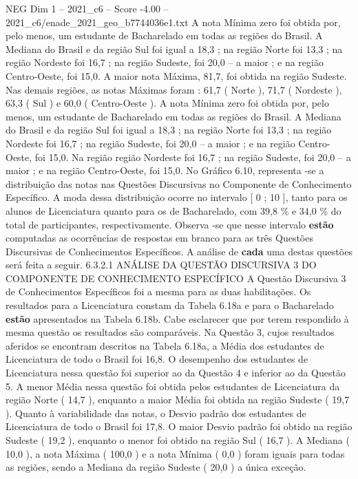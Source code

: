 \begin{textsample}{NEG Dim 1 – 2021\_c6 – Score -4.00 – 2021\_c6/enade\_2021\_geo\_b7744036e1.txt}
A nota Mínima zero foi obtida por, pelo menos, um estudante de Bacharelado em todas as regiões do Brasil.
A Mediana do Brasil e da região Sul foi igual a 18,3 ; na região Norte foi 13,3 ; na região Nordeste foi 16,7 ; na região Sudeste, foi 20,0 – a maior ; e na região Centro-Oeste, foi 15,0.
A maior nota Máxima, 81,7, foi obtida na região Sudeste.
Nas demais regiões, as notas Máximas foram : 61,7 ( Norte ), 71,7 ( Nordeste ), 63,3 ( Sul ) e 60,0 ( Centro-Oeste ).
A nota Mínima zero foi obtida por, pelo menos, um estudante de Bacharelado em todas as regiões do Brasil.
A Mediana do Brasil e da região Sul foi igual a 18,3 ; na região Norte foi 13,3 ; na região Nordeste foi 16,7 ; na região Sudeste, foi 20,0 – a maior ; e na região Centro-Oeste, foi 15,0.
Na região região Nordeste foi 16,7 ; na região Sudeste, foi 20,0 – a maior ; e na região Centro-Oeste, foi 15,0.
No Gráfico 6.10, representa -se a distribuição das notas nas Questões Discursivas no Componente de Conhecimento Específico.
A moda dessa distribuição ocorre no intervalo [ 0 ; 10 ], tanto para os alunos de Licenciatura quanto para os de Bacharelado, com 39,8 \% e 34,0 \% do total de participantes, respectivamente.
Observa -se que nesse intervalo \textbf{estão} computadas as ocorrências de respostas em branco para as três Questões Discursivas de Conhecimentos Específicos.
A análise de \textbf{cada} uma destas questões será feita a seguir. 6.3.2.1 ANÁLISE DA QUESTÃO DISCURSIVA 3 DO COMPONENTE DE CONHECIMENTO ESPECÍFICO A Questão Discursiva 3 de Conhecimentos Específicos foi a mesma para as duas habilitações.
Os resultados para a Licenciatura constam da Tabela 6.18a e para o Bacharelado \textbf{estão} apresentados na Tabela 6.18b.
Cabe esclarecer que por terem respondido à mesma questão os resultados são comparáveis.
Na Questão 3, cujos resultados aferidos se encontram descritos na Tabela 6.18a, a Média dos estudantes de Licenciatura de todo o Brasil foi 16,8.
O desempenho dos estudantes de Licenciatura nessa questão foi superior ao da Questão 4 e inferior ao da Questão 5.
A menor Média nessa questão foi obtida pelos estudantes de Licenciatura da região Norte ( 14,7 ), enquanto a maior Média foi obtida na região Sudeste ( 19,7 ).
Quanto à variabilidade das notas, o Desvio padrão dos estudantes de Licenciatura de todo o Brasil foi 17,8.
O maior Desvio padrão foi obtido na região Sudeste ( 19,2 ), enquanto o menor foi obtido na região Sul ( 16,7 ).
A Mediana ( 10,0 ), a nota Máxima ( 100,0 ) e a nota Mínima ( 0,0 ) foram iguais para todas as regiões, sendo a Mediana da região Sudeste ( 20,0 ) a única exceção.

\end{textsample}

